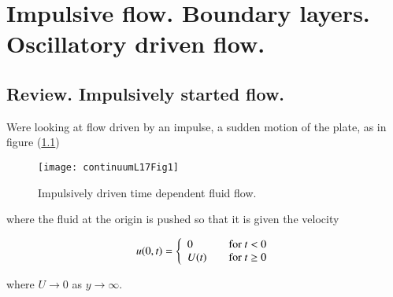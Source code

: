 %
%

\chapter{Impulsive flow.  Boundary layers.  Oscillatory driven flow.}
\label{chap:continuumL17}
{}
\date{Mar 16, 2012}

\beginArtWithToc

%

\section{Review.  Impulsively started flow.}

Were looking at flow driven by an impulse, a sudden motion of the plate, as in figure (\ref{fig:continuumL17:continuumL17Fig1})
\begin{figure}[htp]
   \centering
   \texttt{[image: continuumL17Fig1]}
   \caption{Impulsively driven time dependent fluid flow.}\label{fig:continuumL17:continuumL17Fig1}
\end{figure}

where the fluid at the origin is pushed so that it is given the velocity

\begin{equation}\label{eqn:continuumL17:20}
u(0, t) = 
\left\{
\begin{array}{l l}
0 & \quad \mbox{for $t < 0$} \\
U(t) & \quad \mbox{for $t \ge 0$} \\
\end{array}
\right.
\end{equation}

where $U \rightarrow 0$ as $y \rightarrow \infty$.

